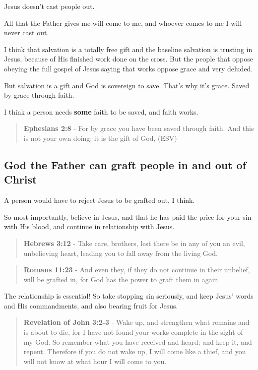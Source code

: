 \documentclass[11pt]{article}
\begin{document}
Jesus doesn't cast people out.

All that the Father gives me will come to me, and whoever comes to me I will
never cast out.

I think that salvation is a totally free gift and the baseline salvation is trusting in Jesus, because of His
finished work done on the cross. But the people that oppose obeying the full gospel of Jesus saying that works oppose grace and very deluded.

But salvation is a gift and God is sovereign to save.
That's why it's grace.
Saved by grace through faith.

I think a person needs \textbf{some} faith to be saved, and faith works.

\begin{quote}
\textbf{Ephesians 2:8} - For by grace you have been saved through faith. And this is not your own doing; it is the gift of God, (ESV)
\end{quote}

\subsection{God the Father can graft people in and out of Christ}
\label{sec:orgdd192af}
A person would have to reject Jesus to be grafted out, I think.

So most importantly, believe in Jesus, and that he has paid the price for your sin with His blood, and continue in relationship with Jesus.

\begin{quote}
\textbf{Hebrews 3:12} - Take care, brothers, lest there be in any of you an evil, unbelieving heart, leading you to fall away from the living God.
\end{quote}

\begin{quote}
\textbf{Romans 11:23} - And even they, if they do not continue in their unbelief, will be grafted in, for God has the power to graft them in again.
\end{quote}

The relationship is essential!
So take stopping sin seriously, and keep Jesus' words and His commandments, and also bearing fruit for Jesus.

\begin{quote}
\textbf{Revelation of John 3:2-3} - Wake up, and strengthen what remains and is about to die, for I have not found your works complete in the sight of my God. So remember what you have received and heard; and keep it, and repent. Therefore if you do not wake up, I will come like a thief, and you will not know at what hour I will come to you.
\end{quote}
\end{document}
